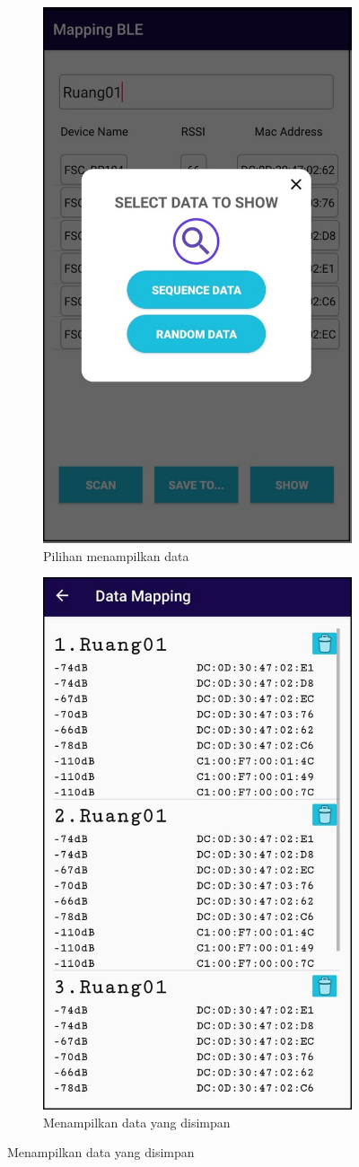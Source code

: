 \begin{enumerate}[a.]
\begin{figure} [H]
\begin{subfigure}{.5\textwidth}
  		\includegraphics[width=.5\linewidth]{gambar/android/mapping-show-data}  
  		\caption{Pilihan menampilkan data}
	\end{subfigure}
	\vspace{1cm}
	\newline
	\begin{subfigure}{.5\textwidth}
  		\centering
  		\includegraphics[width=.5\linewidth]{gambar/android/mapping-data-list}  
  		\caption{Menampilkan data yang disimpan}

\end{subfigure}
\end{figure}
\end{enumerate}
